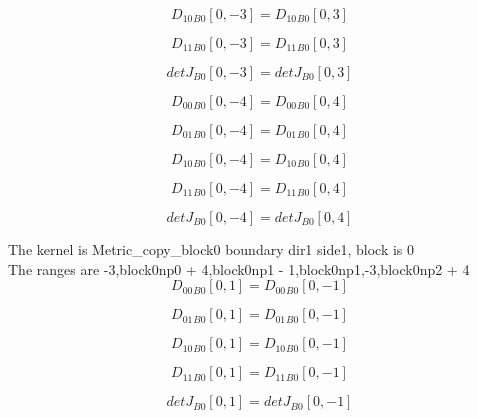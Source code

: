 \documentclass{article}
\begin{document}
\begin{dmath}{D_{10}{_{B0}}}[{0,-3}] = {D_{10}{_{B0}}}[{0,3}]\end{dmath}

\begin{dmath}{D_{11}{_{B0}}}[{0,-3}] = {D_{11}{_{B0}}}[{0,3}]\end{dmath}

\begin{dmath}{detJ{_{B0}}}[{0,-3}] = {detJ{_{B0}}}[{0,3}]\end{dmath}

\begin{dmath}{D_{00}{_{B0}}}[{0,-4}] = {D_{00}{_{B0}}}[{0,4}]\end{dmath}

\begin{dmath}{D_{01}{_{B0}}}[{0,-4}] = {D_{01}{_{B0}}}[{0,4}]\end{dmath}

\begin{dmath}{D_{10}{_{B0}}}[{0,-4}] = {D_{10}{_{B0}}}[{0,4}]\end{dmath}

\begin{dmath}{D_{11}{_{B0}}}[{0,-4}] = {D_{11}{_{B0}}}[{0,4}]\end{dmath}

\begin{dmath}{detJ{_{B0}}}[{0,-4}] = {detJ{_{B0}}}[{0,4}]\end{dmath}

\noindent The kernel is Metric_copy_block0 boundary dir1 side1, block is 0\\\noindent The ranges are -3,block0np0 + 4,block0np1 - 1,block0np1,-3,block0np2 + 4\\\begin{dmath}{D_{00}{_{B0}}}[{0,1}] = {D_{00}{_{B0}}}[{0,-1}]\end{dmath}

\begin{dmath}{D_{01}{_{B0}}}[{0,1}] = {D_{01}{_{B0}}}[{0,-1}]\end{dmath}

\begin{dmath}{D_{10}{_{B0}}}[{0,1}] = {D_{10}{_{B0}}}[{0,-1}]\end{dmath}

\begin{dmath}{D_{11}{_{B0}}}[{0,1}] = {D_{11}{_{B0}}}[{0,-1}]\end{dmath}

\begin{dmath}{detJ{_{B0}}}[{0,1}] = {detJ{_{B0}}}[{0,-1}]\end{dmath}
\end{document}

